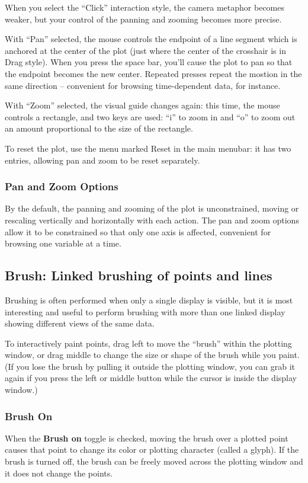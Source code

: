 \documentclass[11pt]{article}
\begin{document}
When you select the ``Click'' interaction style, the camera metaphor
becomes weaker, but your control of the panning and zooming becomes
more precise.

With ``Pan'' selected, the mouse controls the endpoint of a line
segment which is anchored at the center of the plot (just where the
center of the crosshair is in Drag style).  When you press the space
bar, you'll cause the plot to pan so that the endpoint becomes the
new center.  Repeated presses repeat the mostion in the same
direction -- convenient for browsing time-dependent data, for
instance.

With ``Zoom'' selected, the visual guide changes again:  this time,
the mouse controls a rectangle, and two keys are used:  ``i'' to
zoom in and ``o'' to zoom out an amount proportional to the size
of the rectangle.

To reset the plot, use the menu marked Reset in the main menubar:
it has two entries, allowing pan and zoom to be reset separately.

\subsubsection{Pan and Zoom Options}

By the default, the panning and zooming of the plot is unconstrained,
moving or rescaling vertically and horizontally with each action.
The pan and zoom options allow it to be constrained so that only
one axis is affected, convenient for browsing one variable at a time.

\subsection{Brush: Linked brushing of points and lines}
\label{slbl:Brush}

Brushing is often performed when only a single display is visible,
but it is most interesting and useful to perform brushing with more
than one linked display showing different views of the same data.  

To interactively paint points, drag left to move the ``brush'' within
the plotting window, or drag middle to change the size or shape of
the brush while you paint.  (If you lose the brush by pulling it
outside the plotting window, you can grab it again if you press the
left or middle button while the cursor is inside the display window.)

\subsubsection{Brush On}
%
When the {\bf Brush on} toggle is checked, moving the brush
over a plotted point causes that point to change its color or
plotting character (called a glyph).  If the brush is turned off, the
brush can be freely moved across the plotting window and it does not
change the points.  
\end{document}
